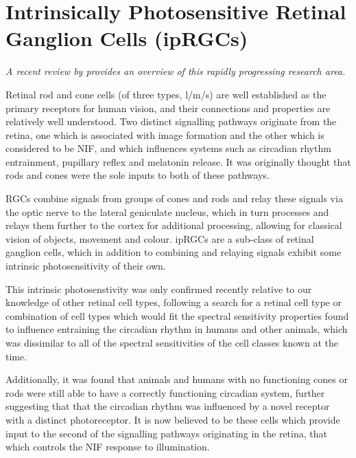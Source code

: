 \section{Intrinsically Photosensitive Retinal Ganglion Cells (ipRGCs)}

\textit{A recent review by \citet{spitschan_melanopsin_2019} provides an overview of this rapidly progressing research area.}

\bigskip

Retinal rod and cone cells (of three types, l/m/s) are well established as the primary receptors for human vision, and their connections and properties are relatively well understood. Two distinct signalling pathways originate from the retina, one which is associated with image formation and the other which is considered to be \gls{NIF}, and which influences systems such as circadian rhythm entrainment, pupillary reflex and melatonin release. It was originally thought that rods and cones were the sole inputs to both of these pathways\citep{hankins_melanopsin_2008}.

\Glspl{RGC} combine signals from groups of cones and rods and relay these signals via the optic nerve to the lateral geniculate nucleus, which in turn processes and relays them further to the cortex for additional processing, allowing for classical vision of objects, movement and colour. \Glspl{ipRGC} are a sub-class of retinal ganglion cells, which in addition to combining and relaying signals exhibit some intrinsic photosensitivity of their own. 

This intrinsic photosenstivity was only confirmed recently\citep{qiu_induction_2005} relative to our knowledge of other retinal cell types, following a search for a retinal cell type or combination of cell types which would fit the spectral sensitivity properties found to influence entraining the circadian rhythm in humans and other animals\citep{brainard_human_2001,brainard_action_2001}, which was dissimilar to all of the spectral sensitivities of the cell classes known at the time.

Additionally, it was found that animals and humans with no functioning cones or rods were still able to have a correctly functioning circadian system\citep{freedman_regulation_1999,zaidi_short-wavelength_2007}, further suggesting that that the circadian rhythm was influenced by a novel receptor with a distinct photoreceptor. It is now believed to be these cells which provide input to the second of the signalling pathways originating in the retina, that which controls the \gls{NIF} response to illumination.

